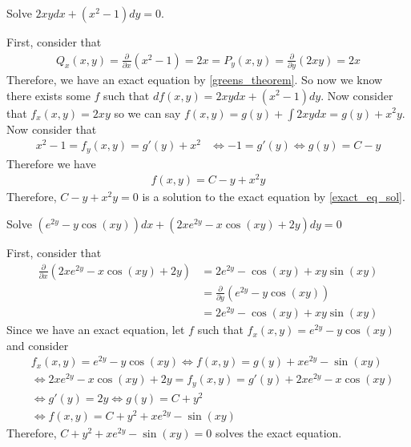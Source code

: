 \documentclass[notes]{subfiles}
\begin{document}
\begin{exercise}
    Solve $2xydx + (x^2 - 1)dy = 0$.
\end{exercise}
\begin{solution}
    First, consider that
    \begin{align*}
        Q_x(x, y) = \frac{\partial}{\partial x}(x^2 - 1) = 2x = P_y(x, y) = \frac{\partial}{\partial y}(2xy) = 2x
    \end{align*}
    Therefore, we have an exact equation by \cref{greens_theorem}. So now we know there exists some $f$ such that $df(x, y) = 2xydx + (x^2 - 1)dy$. Now consider that $f_x(x, y) = 2xy$ so we can say $f(x, y) = g(y) + \int 2xydx = g(y) + x^2 y$. Now consider that
    \begin{align*}
        x^2 - 1 = f_y(x, y) = g'(y) + x^2
        &\iff -1 = g'(y)
        \iff g(y) = C - y
    \end{align*}
    Therefore we have
    \begin{align*}
        f(x, y) = C - y + x^2 y
    \end{align*}
    Therefore, $C - y + x^2 y = 0$ is a solution to the exact equation by \cref{exact_eq_sol}.
\end{solution}

\begin{exercise} \label{ee_exercise_1}
    Solve $(e^{2y} - y\cos(xy))dx + (2xe^{2y} - x\cos(xy) + 2y)dy = 0$
\end{exercise}
\begin{solution}
    First, consider that
    \begin{align*}
        \frac{\partial}{\partial x} (2xe^{2y} - x\cos(xy) + 2y)
        &= 2e^{2y} - \cos(xy) + xy\sin(xy) \\
        &= \frac{\partial}{\partial y} (e^{2y} - y\cos(xy)) \\
        &= 2e^{2y} - \cos(xy) + xy\sin(xy)
    \end{align*}
    Since we have an exact equation, let $f$ such that $f_x(x, y) = e^{2y} - y\cos(xy)$ and consider
    \begin{align*}
        &f_x(x, y) = e^{2y} - y\cos(xy)
        \iff f(x, y) = g(y) + x e^{2y} - \sin(xy) \\
        &\iff 2xe^{2y} - x\cos(xy) + 2y = f_y(x, y) = g'(y) + 2x e^{2y} - x\cos(xy) \\
        &\iff g'(y) = 2y
        \iff g(y) = C + y^2 \\
        &\iff f(x, y) = C + y^2 + x e^{2y} - \sin(xy)
    \end{align*}
    Therefore, $C + y^2 + x e^{2y} - \sin(xy) = 0$ solves the exact equation.
\end{solution}
\end{document}
